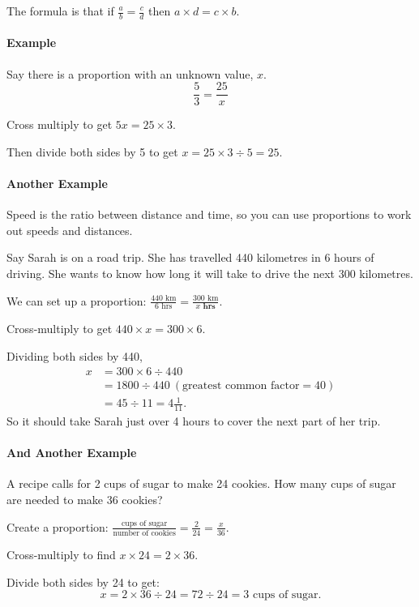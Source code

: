 \documentclass{article}
\begin{document}
\begin{spacing}{1.25}
\begin{enumerate}
The formula is that if $\frac{a}{b}=\frac{c}{d}$ then $a\times d=c\times b$.\\

\paragraph{Example}
Say there is a proportion with an unknown value, $x$.\\
$$\frac{5}{3}=\frac{25}{x}$$

Cross multiply to get $5x=25\times3$.

Then divide both sides by 5 to get $x=25\times3\div5=25$.\\

\paragraph{Another Example}

Speed is the ratio between distance and time, so you can use proportions to work out speeds and distances.

Say Sarah is on a road trip. She has travelled 440 kilometres in 6 hours of driving. She wants to know how long it will take to drive the next 300 kilometres.

We can set up a proportion: $\frac{440\text{ km}}{6\text{ hrs}}=\frac{300\text{ km}}{x\textbf{ hrs}}$.

Cross-multiply to get $440 \times x = 300 \times 6$.

Dividing both sides by 440,
\begin{align*}
x &= 300 \times 6 \div 440\\
  &= 1800 \div 440 \ (\textrm{greatest common factor} = 40)\\
  &= 45 \div 11 = 4 \frac{1}{11}.
\end{align*}
So it should take Sarah  just over 4 hours to cover the next part of her trip.

\paragraph{And Another Example}
A recipe calls for 2 cups of sugar to make 24 cookies. How many cups of sugar are needed to make 36 cookies?
    
Create a proportion: $\frac{\text{cups of sugar}}{\text{number of cookies}}=\frac{2}{24}=\frac{x}{36}$.

Cross-multiply to find $x \times 24 = 2 \times 36$.

Divide both sides by 24 to get:
$$x=2 \times 36 \div 24 = 72 \div 24 = 3\textrm{ cups of sugar.}$$


\end{enumerate}
\end{spacing}
\end{document}
